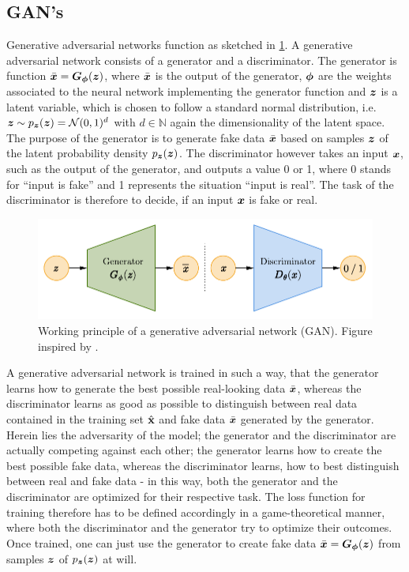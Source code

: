 \documentclass[a4paper,11pt]{report}
\def\fc#1{{\color{black}{#1}}} %
\begin{document}
\subsection{GAN's}
Generative adversarial networks function as sketched in \cref{fig:GAN}. A generative adversarial network consists of a generator and a discriminator. The generator is \fc{basically a} function $\bar{\bm{x}} = \bm{G}_{\bm{\phi}}(\bm{z})$, where $\bar{\bm{x}}$ is the output of the generator, $\bm{\phi}$ are the weights associated to the neural network implementing the generator function and $\bm{z}$ is a latent variable, which is chosen to follow a standard normal distribution, i.e. $\bm{z} \sim p_{\bm{z}}(\bm{z}) = \mathcal{N}(0,1)^d$ with $d \in \mathbb{N}$ again the dimensionality of the latent space. The purpose of the generator is to generate fake data $\bar{\bm{x}}$ based on samples $\bm{z}$ of the latent probability density $p_{\bm{z}}(\bm{z})$. The discriminator however takes an input $\bm{x}$, such as the output of the generator, and outputs a value 0 or 1, where 0 stands for ``input is fake'' and 1 represents the situation ``input is real''. The task of the discriminator is therefore to decide, if an input $\bm{x}$ is fake or real.
\begin{figure}[h!]
\centering
\includegraphics[width=\linewidth-4cm]{figures/GAN.pdf}
\caption{Working principle of a generative adversarial network (GAN). Figure inspired by \cite{weng2018flow}.}
\label{fig:GAN}
\end{figure}

A generative adversarial network is trained in such a way, that the generator learns how to generate the best possible real-looking data $\bar{\bm{x}}$, whereas the discriminator learns as good as possible to distinguish between real data contained in the training set $\hat{\boldsymbol{\mathbf{x}}}$ and fake data $\bar{\bm{x}}$ generated by the generator. Herein lies the adversarity of the model; the generator and the discriminator are actually competing against each other; the generator learns how to create the best possible fake data, whereas the discriminator learns, how to best distinguish between real and fake data - in this way, both the generator and the discriminator are optimized for their respective task. The loss function for training therefore has to be defined accordingly in a game-theoretical manner, where both the discriminator and the generator try to optimize their outcomes. Once trained, one can just use the generator to create fake data $\bar{\bm{x}} = \bm{G}_{\bm{\phi}}(\bm{z})$ from samples $\bm{z}$ of $p_{\bm{z}}(\bm{z})$ at will.
\end{document}
